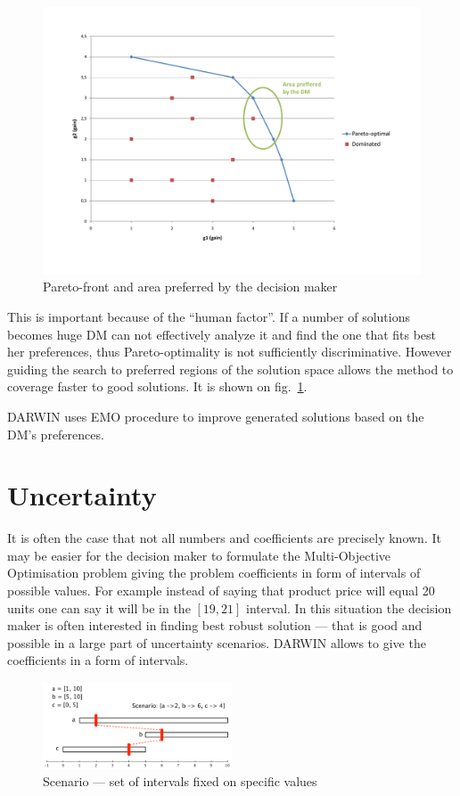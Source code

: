 \begin{figure}
  \centering \includegraphics[width=1.2\textwidth]{img/pareto}
  \caption{Pareto-front and area preferred by the decision maker}
  \label{pareto}
\end{figure}

This is important because of the ``human factor''. If a number of solutions
becomes huge DM can not effectively analyze it and find the one that fits best
her preferences, thus Pareto-optimality is not sufficiently
discriminative. However guiding the search to preferred regions of the
solution space allows the method to coverage faster to good solutions. It is
shown on fig.~\ref{pareto}.

DARWIN uses EMO procedure to improve generated solutions based on the DM's
preferences.


\section{Uncertainty}

It is often the case that not all numbers and coefficients are precisely
known. It may be easier for the decision maker to formulate the
Multi-Objective Optimisation problem giving the problem coefficients in form
of intervals of possible values. For example instead of saying that product
price will equal 20 units one can say it will be in the $[19, 21]$
interval. In this situation the decision maker is often interested in finding
best robust solution --- that is good and possible in a large part of
uncertainty scenarios. DARWIN allows to give the coefficients in a form of
intervals.

\begin{figure}
  \centering \includegraphics[width=0.5\textwidth]{img/scenario}
  \caption{Scenario --- set of intervals fixed on specific values}
  \label{scenario}
\end{figure}

